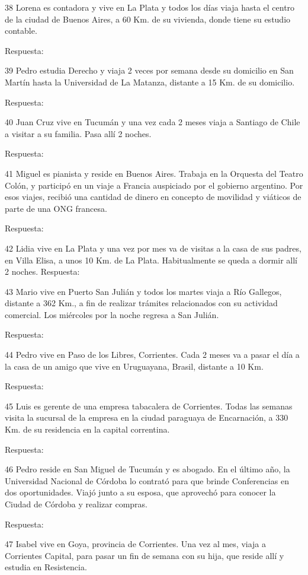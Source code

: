 \documentclass[
  openany]{book}
\begin{document}
38 Lorena es contadora y vive en La Plata y todos los días viaja hasta el centro de la ciudad de Buenos Aires, a 60 Km. de su vivienda, donde tiene su estudio contable.

Respuesta:

39 Pedro estudia Derecho y viaja 2 veces por semana desde su domicilio en San Martín hasta la Universidad de La Matanza, distante a 15 Km. de su domicilio.

Respuesta:

40 Juan Cruz vive en Tucumán y una vez cada 2 meses viaja a Santiago de Chile a visitar a su familia. Pasa allí 2 noches.

Respuesta:

41 Miguel es pianista y reside en Buenos Aires. Trabaja en la Orquesta del Teatro Colón, y participó en un viaje a Francia auspiciado por el gobierno argentino. Por esos viajes, recibió una cantidad de dinero en concepto de movilidad y viáticos de parte de una ONG francesa.

Respuesta:

42 Lidia vive en La Plata y una vez por mes va de visitas a la casa de sus padres, en Villa Elisa, a unos 10 Km. de La Plata. Habitualmente se queda a dormir allí 2 noches. Respuesta:

43 Mario vive en Puerto San Julián y todos los martes viaja a Río Gallegos, distante a 362 Km., a fin de realizar trámites relacionados con su actividad comercial. Los miércoles por la noche regresa a San Julián.

Respuesta:

44 Pedro vive en Paso de los Libres, Corrientes. Cada 2 meses va a pasar el día a la casa de un amigo que vive en Uruguayana, Brasil, distante a 10 Km.

Respuesta:

45 Luis es gerente de una empresa tabacalera de Corrientes. Todas las semanas visita la sucursal de la empresa en la ciudad paraguaya de Encarnación, a 330 Km. de su residencia en la capital correntina.

Respuesta:

46 Pedro reside en San Miguel de Tucumán y es abogado. En el último año, la Universidad Nacional de Córdoba lo contrató para que brinde Conferencias en dos oportunidades. Viajó junto a su esposa, que aprovechó para conocer la Ciudad de Córdoba y realizar compras.

Respuesta:

47 Isabel vive en Goya, provincia de Corrientes. Una vez al mes, viaja a Corrientes Capital, para pasar un fin de semana con su hija, que reside allí y estudia en Resistencia.
\end{document}
